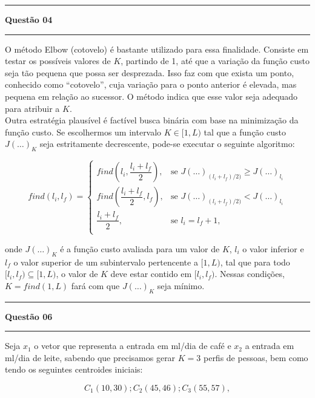 \noindent\rule{\textwidth}{0.5mm}
\textbf{Questão 04}\\
\rule{\textwidth}{0.5mm}

O método Elbow (cotovelo) é bastante utilizado para essa finalidade. Consiste em testar os possíveis valores de $K$, partindo de 1, até que a variação da função custo seja tão pequena que possa ser desprezada. Isso faz com que exista um ponto, conhecido como ``cotovelo'', cuja variação para o ponto anterior é elevada, mas pequena em relação ao sucessor. O método indica que esse valor seja adequado para atribuir a $K$.\\

Outra estratégia plausível é factível busca binária com base na minimização da função custo. Se escolhermos um intervalo $K \in [1, L)$ tal que a função custo $J(\ldots)_K$ seja estritamente decrescente, pode-se executar o seguinte algoritmo:

\begin{equation*}
    find(l_i, l_f) = \left\{
    \begin{array}{ll}
        find\left(l_i, \dfrac{l_i + l_f}{2} \right), &\textrm{se $J(\ldots)_{(l_i + l_f)/2)} \geq J(\ldots)_{l_i}$}\\
        find\left(\dfrac{l_i + l_f}{2}, l_f \right), &\textrm{se $J(\ldots)_{(l_i + l_f)/2)} < J(\ldots)_{l_i}$}\\
        \dfrac{l_i + l_f}{2},    &   \textrm{se $l_i = l_f + 1$},\\
    \end{array}
    \right.
\end{equation*}

\noindent
onde $J(\ldots)_K$ é a função custo avaliada para um valor de $K$, $l_i$ o valor inferior e $l_f$ o valor superior de um subintervalo pertencente a $[1, L)$, tal que para todo $[l_i, l_f) \subseteq [1, L)$, o valor de $K$ deve estar contido em $[l_i, l_f)$. Nessas condições, $K = find(1, L)$ fará com que $J(\ldots)_K$ seja mínimo.\\

\noindent\rule{\textwidth}{0.5mm}
\textbf{Questão 06}\\
\rule{\textwidth}{0.5mm}

Seja $x_1$ o vetor que representa a entrada em ml/dia de café e $x_2$ a entrada em ml/dia de leite, sabendo que precisamos gerar $K = 3$ perfis de pessoas, bem como tendo os seguintes centroides iniciais:

\begin{equation*}
    C_1(10, 30); C_2(45, 46); C_3(55, 57),
\end{equation*}

